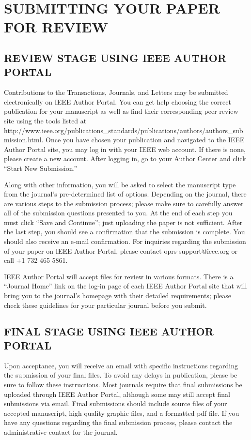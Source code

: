 \documentclass[journal,onecolumn,web]{ieeecolor}
\begin{document}
\section*{SUBMITTING YOUR PAPER FOR REVIEW}

\subsection{REVIEW STAGE USING IEEE AUTHOR PORTAL}

Contributions to the Transactions, Journals, and Letters may be submitted electronically on IEEE Author Portal. You can get help choosing the correct publication for your manuscript as well as find their corresponding peer review site using the tools listed at http://\discretionary{}{}{}www.ieee.org/\discretionary{}{}{}publications\_standards/\discretionary{}{}{}publications/\discretionary{}{}{}authors/\discretionary{}{}{}authors\_submission.html. Once you have chosen your publication and navigated to the IEEE Author Portal site, you may log in with your IEEE web account. If there is none, please create a new account. After logging in, go to your Author Center and click ``Start New Submission.''

Along with other information, you will be asked to select the manuscript type from the journal's pre-determined list of options. Depending on the journal, there are various steps to the submission process; please make sure to carefully answer all of the submission questions presented to you. At the end of each step you must click ``Save and Continue''; just uploading the paper is not sufficient. After the last step, you should see a confirmation that the submission is complete. You should also receive an e-mail confirmation. For inquiries regarding the submission of your paper on IEEE Author Portal, please contact oprs-support@ieee.org or call +1 732 465 5861.

IEEE Author Portal will accept files for review in various formats. There is a ``Journal Home'' link on the log-in page of each IEEE Author Portal site that will bring you to the journal's homepage with their detailed requirements; please check these guidelines for your particular journal before you submit.

\subsection{FINAL STAGE USING IEEE AUTHOR PORTAL}
Upon acceptance, you will receive an email with specific instructions
regarding the submission of your final files. To avoid any delays in
publication, please be sure to follow these instructions. Most journals
require that final submissions be uploaded through IEEE Author Portal,
although some may still accept final submissions via email. Final
submissions should include source files of your accepted manuscript, high
quality graphic files, and a formatted pdf file. If you have any questions
regarding the final submission process, please contact the administrative
contact for the journal.
\end{document}
